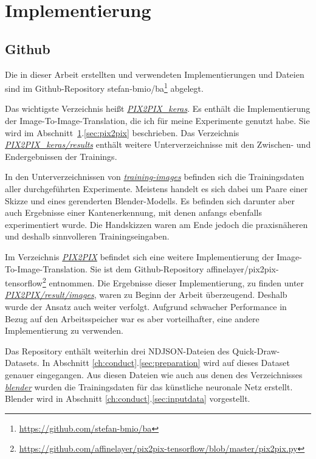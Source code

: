 \chapter{Implementierung}
\label{ch:impl}

\section{Github}
\label{sec:github}
Die in dieser Arbeit erstellten und verwendeten Implementierungen und Dateien sind im Github-Repository stefan-bmio/ba\footnote{\href{https://github.com/stefan-bmio/ba}{https://github.com/stefan-bmio/ba}} abgelegt.

Das wichtigste Verzeichnis heißt \textit{\url{PIX2PIX_keras}}. Es enthält die Implementierung der Image-To-Image-Translation, die ich für meine Experimente genutzt habe. Sie wird im Abschnitt~\ref{ch:impl}.\ref{sec:pix2pix} beschrieben. Das Verzeichnis \textit{\url{PIX2PIX_keras/results}} enthält weitere Unterverzeichnisse mit den Zwischen- und Endergebnissen der Trainings.

In den Unterverzeichnissen von \textit{\url{training-images}} befinden sich die Trainingsdaten aller durchgeführten Experimente. Meistens handelt es sich dabei um Paare einer Skizze und eines gerenderten Blender-Modells. Es befinden sich darunter aber auch Ergebnisse einer Kantenerkennung, mit denen anfangs ebenfalls experimentiert wurde. Die Handskizzen waren am Ende jedoch die praxisnäheren und deshalb sinnvolleren Trainingseingaben.

Im Verzeichnis \textit{\url{PIX2PIX}} befindet sich eine weitere Implementierung der Image-To-Image-Translation. Sie ist dem Github-Repository affinelayer/pix2pix-tensorflow\footnote{\href{https://github.com/affinelayer/pix2pix-tensorflow/blob/master/pix2pix.py}{https://github.com/affinelayer/pix2pix-tensorflow/blob/master/pix2pix.py}} entnommen. Die Ergebnisse dieser Implementierung, zu finden unter \textit{\url{PIX2PIX/result/images}}, waren zu Beginn der Arbeit überzeugend. Deshalb wurde der Ansatz auch weiter verfolgt. Aufgrund schwacher Performance in Bezug auf den Arbeitsspeicher war es aber vorteilhafter, eine andere Implementierung zu verwenden.

Das Repository enthält weiterhin drei NDJSON-Dateien des Quick-Draw-Datasets. In Abschnitt \ref{ch:conduct}.\ref{sec:preparation} wird auf dieses Dataset genauer eingegangen. Aus diesen Dateien wie auch aus denen des Verzeichnisses \textit{\url{blender}} wurden die Trainingsdaten für das künstliche neuronale Netz erstellt. Blender wird in Abschnitt \ref{ch:conduct}.\ref{sec:inputdata} vorgestellt.

